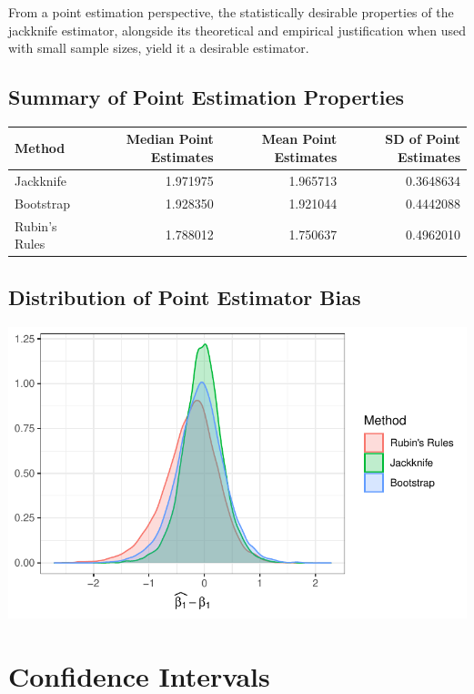 \documentclass[
  letterpaper,
  DIV=11,
  numbers=noendperiod]{scrreprt}
\begin{document}
From a point estimation perspective, the statistically desirable
properties of the jackknife estimator, alongside its theoretical and
empirical justification when used with small sample sizes, yield it a
desirable estimator.

\hypertarget{sec-point}{%
\subsection{Summary of Point Estimation Properties}\label{sec-point}}

\begin{tabular}{l|r|r|r}
\hline
Method & Median Point Estimates  & Mean Point Estimates & SD of Point Estimates\\
\hline
Jackknife & 1.971975 & 1.965713 & 0.3648634\\
\hline
Bootstrap & 1.928350 & 1.921044 & 0.4442088\\
\hline
Rubin's Rules & 1.788012 & 1.750637 & 0.4962010\\
\hline
\end{tabular}

\hypertarget{sec-dist}{%
\subsection{Distribution of Point Estimator Bias}\label{sec-dist}}

\includegraphics{./results_files/figure-pdf/unnamed-chunk-3-1.pdf}

\hypertarget{sec-ci}{%
\section{Confidence Intervals}\label{sec-ci}}
\end{document}

